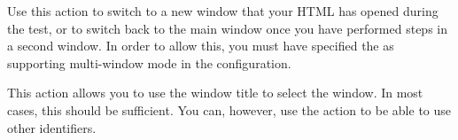 
Use this action to switch to a new window that your HTML \gdaut{} has opened during the test, or to switch back to the main window once you have performed steps in a second window. In order to allow this, you must have specified the \gdaut{} as supporting multi-window mode in the \gdaut{} configuration. 

This action allows you to use the window title to select the window. In most cases, this should be sufficient. You can, however, use the action  to be able to use other identifiers. 
